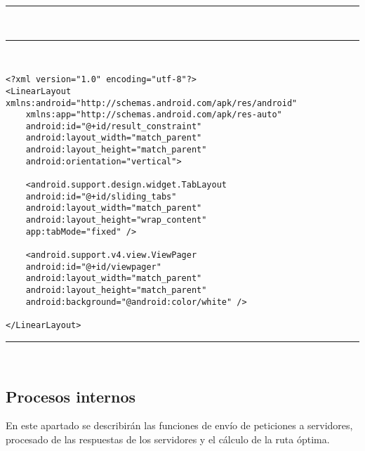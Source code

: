 \noindent\rule[-1ex]{\textwidth}{1pt}\\
\newpage
\noindent\rule[-1ex]{\textwidth}{1pt}\\
\begin{lstlisting}[caption=Código XML de la vista con tabs.]
<?xml version="1.0" encoding="utf-8"?>
<LinearLayout xmlns:android="http://schemas.android.com/apk/res/android"
	xmlns:app="http://schemas.android.com/apk/res-auto"
	android:id="@+id/result_constraint"
	android:layout_width="match_parent"
	android:layout_height="match_parent"
	android:orientation="vertical">

	<android.support.design.widget.TabLayout
	android:id="@+id/sliding_tabs"
	android:layout_width="match_parent"
	android:layout_height="wrap_content"
	app:tabMode="fixed" />
	
	<android.support.v4.view.ViewPager
	android:id="@+id/viewpager"
	android:layout_width="match_parent"
	android:layout_height="match_parent"
	android:background="@android:color/white" />

</LinearLayout>
\end{lstlisting}
\noindent\rule[-1ex]{\textwidth}{1pt}\\

\subsection[Procesos internos]{Procesos internos}
En este apartado se describirán las funciones de envío de peticiones a servidores, procesado de las respuestas de los servidores y el cálculo de la ruta óptima.
